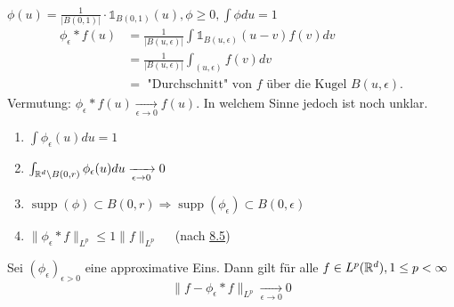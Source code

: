\begin{beispiel*}
	$\phi(u) = \frac{1}{|B(0, 1)|} \cdot \mathds{1}_{B(0, 1)}(u), \phi \geq 0, \int \phi du = 1	$ \\
	\begin{align*}
		\phi_{\epsilon} \ast f(u) & = \frac{1}{|B(u, \epsilon)|} \int \mathds{1}_{B(u, \epsilon)}(u - v) f(v) dv \\
		&  = \frac{1}{|B(u, \epsilon)|} \int_{(u, \epsilon)} f(v) dv \\
		& = \text{ "Durchschnitt" von } f \text{ über die Kugel } B(u, \epsilon). 
	\end{align*}
	Vermutung: $\phi_{\epsilon} \ast f(u) \xrightarrow[\epsilon \rightarrow 0]{} f(u)$. In welchem Sinne jedoch ist noch unklar.
\end{beispiel*}


\begin{bemerkung} \label{bem:8.7}
	\begin{enumerate}[label=\roman*\upshape)]
		\label{bem:8.7i}
		\item $\int \phi_{\epsilon}(u) du = 1$
		\label{bem:8.7ii}
		\item $\int_{\mathbb{R}^{d} \setminus B(0, r)} \phi_{\epsilon}(u) du \xrightarrow[\epsilon \rightarrow 0]{} 0$
		\label{bem:8.7iii}
		\item $\operatorname{supp}(\phi) \subset B(0, r) \Rightarrow \operatorname{supp}(\phi_{\epsilon}) \subset B(0, \epsilon)$
		\label{bem:8.7iv}
		\item $\| \phi_{\epsilon} \ast f \|_{L^{p}} \leq 1 \| f \|_{L^{p}} \quad$ (nach \hyperref[satz:8.5-Young]{8.5})
	\end{enumerate}
\end{bemerkung}


\begin{satz}\label{satz:8.8}
	Sei $(\phi_{\epsilon})_{\epsilon > 0}$ eine approximative Eins. Dann gilt für alle $f \in L^{p}(\mathbb{R}^{d}), 1 \leq p < \infty$
		\[ \| f - \phi_{\epsilon} \ast f \|_{L^{p}} \xrightarrow[\epsilon \rightarrow 0]{} 0 \]
\end{satz}

